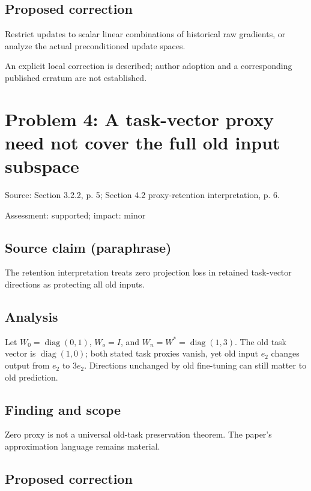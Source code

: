 \documentclass[11pt]{article}
\begin{document}
\subsection*{Proposed correction}

Restrict updates to scalar linear combinations of historical raw gradients, or analyze the actual preconditioned update spaces.

An explicit local correction is described; author adoption and a corresponding published erratum are not established.

\section*{Problem 4: A task-vector proxy need not cover the full old input subspace}

Source: Section 3.2.2, p. 5; Section 4.2 proxy-retention interpretation, p. 6.

Assessment: supported; impact: minor

\subsection*{Source claim (paraphrase)}

The retention interpretation treats zero projection loss in retained task-vector directions as protecting all old inputs.

\subsection*{Analysis}

Let \(W_0=\operatorname{diag}(0,1)\), \(W_o=I\), and \(W_n=W^*=\operatorname{diag}(1,3)\). The old task vector is \(\operatorname{diag}(1,0)\); both stated task proxies vanish, yet old input \(e_2\) changes output from \(e_2\) to \(3e_2\). Directions unchanged by old fine-tuning can still matter to old prediction.

\subsection*{Finding and scope}

Zero proxy is not a universal old-task preservation theorem. The paper’s approximation language remains material.

\subsection*{Proposed correction}
\end{document}
